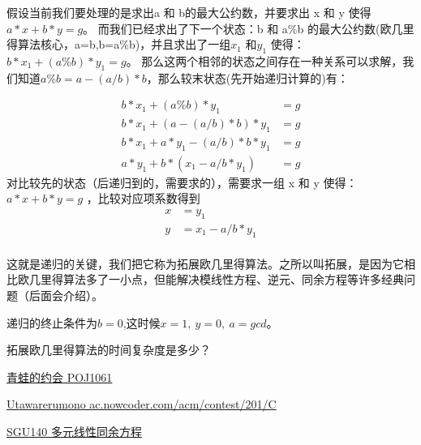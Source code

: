 假设当前我们要处理的是求出a 和 b的最大公约数，并要求出 x 和 y 使得 $a * x + b * y=g$。
而我们已经求出了下一个状态：b 和 a\%b 的最大公约数({\heiti 欧几里得算法核心，a=b,b=a\%b})，并且求出了一组$x_1$ 和$y_1$ 使得：$ b * x_1 + (a\%b) * y_1 = g$。
那么这两个相邻的状态之间存在一种关系可以求解，我们知道$a\%b = a - (a/b)*b$，那么较末状态(先开始递归计算的)有：

\begin{align*}
b * x_1 + (a\%b) * y_1 &= g\\
b*x_{1} + (a-(a/b)*b) * y_{1} &= g \\
b*x_{1} + a*y_{1}-(a/b)*b*y_{1} &=g\\
a*y_{1} + b*(x_{1}-a/b*y_{1})&= g
\end{align*}
对比较先的状态（后递归到的，需要求的），需要求一组 x 和 y 使得：$a*x + b*y = g$ ，比较对应项系数得到
\begin{align*}
x &= y_1\\
y &= x_1 - a/b * y_1 \\
\end{align*}


这就是递归的关键，我们把它称为{\heiti 拓展欧几里得算法}。之所以叫拓展，是因为它相比欧几里得算法多了一小点，但能解决模线性方程、逆元、同余方程等许多经典问题（后面会介绍）。

递归的终止条件为$b=0$,这时候$x=1,\ y=0,\ a = gcd$。



\vbox{}

\vbox{}

\begin{problemset}
	\item 拓展欧几里得算法的时间复杂度是多少？
	\item \href{http://poj.org/problem?id=1061}{青蛙的约会 \quad POJ1061} 
	\item \href{https://ac.nowcoder.com/acm/contest/201/C}{Utawarerumono \quad ac.nowcoder.com/acm/contest/201/C}
	\item \href{https://codeforces.com/problemsets/acmsguru/problem/99999/140}{SGU140 \quad 多元线性同余方程} 
\end{problemset}










